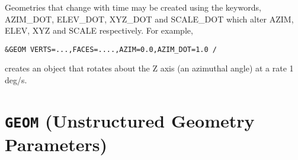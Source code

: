 \documentclass[12pt]{article}
\begin{document}
Geometries that change with time may be created using the keywords, AZIM\_DOT, ELEV\_DOT, XYZ\_DOT and SCALE\_DOT which alter AZIM, ELEV, XYZ and SCALE respectively. For example,
\begin{verbatim}
&GEOM VERTS=...,FACES=....,AZIM=0.0,AZIM_DOT=1.0 /
\end{verbatim}
creates an object that rotates about the Z axis (an azimuthal angle) at a rate 1 deg/s.

\vspace{\baselineskip}




\section{\texorpdfstring{{\tt GEOM}}{GEOM} (Unstructured Geometry Parameters)}
\end{document}
